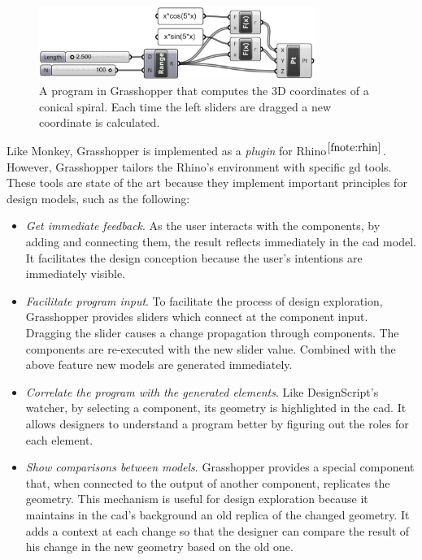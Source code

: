 \begin{figure}[!htbp]
  \centering
  \includegraphics[width=0.8\textwidth]{images/grasshopper}
    \caption{A program in Grasshopper that computes the 3D coordinates of a conical spiral. Each time the left sliders are dragged a new coordinate is calculated.}
  \label{fig:grass}
\end{figure}

Like Monkey, Grasshopper is implemented as a \textit{plugin} for Rhino$^{\ref{fnote:rhin}}$. However, Grasshopper tailors the Rhino's environment with specific \gls{gd} tools. These tools are state of the art because they implement important principles for design models, such as the following:

\begin{itemize}
 \item \textit{Get immediate feedback}. As the user interacts with the components, by adding and connecting them, the result reflects immediately in the \gls{cad} model. It facilitates the design conception because the user's intentions are immediately visible. 
 \item \textit{Facilitate program input}. To facilitate the process of design exploration, Grasshopper provides sliders which connect at the component input. Dragging the slider causes a change propagation through components. The components are re-executed with the new slider value. Combined with the above feature new models are generated immediately.
 \item \textit{Correlate the program with the generated elements}. Like DesignScript's watcher, by selecting a component, its geometry is highlighted in the \gls{cad}. It allows designers to understand a program better by figuring out the roles for each element.
 \item \textit{Show comparisons between models}. Grasshopper provides a special component that, when connected to the output of another component, replicates the geometry. This mechanism is useful for design exploration because it maintains in the \gls{cad}'s background an old replica of the changed geometry. It adds a context at each change so that the designer can compare the result of his change in the new geometry based on the old one.
\end{itemize}

